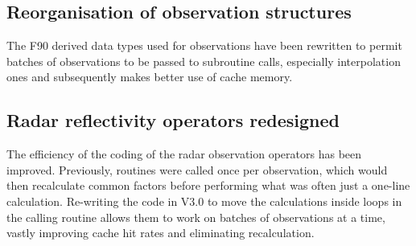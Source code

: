 \subsection{Reorganisation of observation structures}

The F90 derived data types used for observations have been rewritten to permit batches 
of observations to be passed to subroutine calls, especially interpolation ones and 
subsequently makes better use of cache memory.

\subsection{Radar reflectivity operators redesigned}

The efficiency of the coding of the radar observation operators has been improved. 
Previously, routines were called once per observation, which would then recalculate common 
factors before performing what was often just a one-line calculation. Re-writing the code 
in V3.0 to move the calculations inside loops in the calling routine allows them to work 
on batches of observations at a time, vastly improving cache hit rates and eliminating recalculation.

